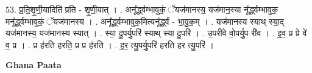 \documentclass[17pt]{extarticle}
\begin{document}
53. प्र॒ति॒शृ॒णी॒यादिति॑ प्रति - शृ॒णी॒यात् । . अनू᳚र्द्ध्वम्भावुकं॒ ॅयज॑मानस्य॒ यज॑मान॒स्या नू᳚र्द्ध्वम्भावुक॒ मनू᳚र्द्ध्वम्भावुकं॒ ॅयज॑मानस्य । . अनू᳚र्द्ध्वम्भावुक॒मित्यनू᳚र्द्ध्वं - भा॒वु॒क॒म् । . यज॑मानस्य स्याथ् स्या॒द् यज॑मानस्य॒ यज॑मानस्य स्यात् । . स्या॒ दु॒पर्यु॒परि॑ स्याथ् स्या दु॒परि॑ । . उ॒परी॑वे वो॒पर्यु॒प री॑व । . इ॒व॒ प्र प्रे वे॑ व॒ प्र । . प्र ह॑रति हरति॒ प्र प्र ह॑रति । . ह॒र॒ त्यु॒पर्यु॒परि॑ हरति हर त्यु॒परि॑ । \newline

\textbf{Ghana Paata } \newline
\end{document}
